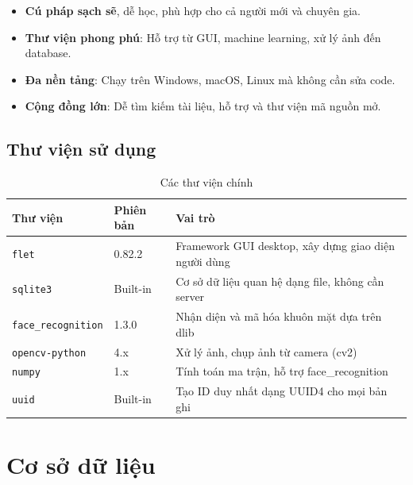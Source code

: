 \documentclass[12pt,a4paper]{article}
\begin{document}
\begin{itemize}[leftmargin=2cm]
	\item \textbf{Cú pháp sạch sẽ}, dễ học, phù hợp cho cả người mới và chuyên gia.
	\item \textbf{Thư viện phong phú}: Hỗ trợ từ GUI, machine learning, xử lý ảnh đến database.
	\item \textbf{Đa nền tảng}: Chạy trên Windows, macOS, Linux mà không cần sửa code.
	\item \textbf{Cộng đồng lớn}: Dễ tìm kiếm tài liệu, hỗ trợ và thư viện mã nguồn mở.
\end{itemize}

\subsection{Thư viện sử dụng}

\begin{table}[H]
	\centering
	\caption{Các thư viện chính}
	\begin{tabularx}{\textwidth}{|l|l|X|}
		\hline
		\textbf{Thư viện}          & \textbf{Phiên bản} & \textbf{Vai trò}                                     \\
		\hline
		\texttt{flet}              & 0.82.2             & Framework GUI desktop, xây dựng giao diện người dùng \\
		\hline
		\texttt{sqlite3}           & Built-in           & Cơ sở dữ liệu quan hệ dạng file, không cần server    \\
		\hline
		\texttt{face\_recognition} & 1.3.0              & Nhận diện và mã hóa khuôn mặt dựa trên dlib          \\
		\hline
		\texttt{opencv-python}     & 4.x                & Xử lý ảnh, chụp ảnh từ camera (cv2)                  \\
		\hline
		\texttt{numpy}             & 1.x                & Tính toán ma trận, hỗ trợ face\_recognition          \\
		\hline
		\texttt{uuid}              & Built-in           & Tạo ID duy nhất dạng UUID4 cho mọi bản ghi           \\
		\hline
	\end{tabularx}
\end{table}

\section{Cơ sở dữ liệu}
\end{document}

